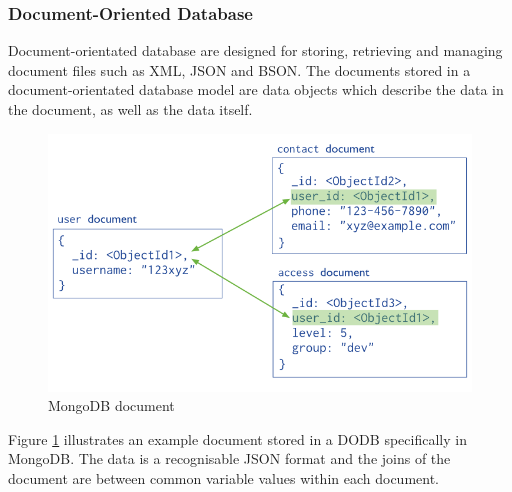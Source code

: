\subsubsection{Document-Oriented Database}
Document-orientated database are designed for storing, retrieving and managing document files such as XML, JSON and BSON. The documents stored in a document-orientated database model are data objects which describe the data in the document, as well as the data itself. \begin{figure}[h]\begin{center}\includegraphics[width=0.75\linewidth]{images/mongodbmodel}\caption{MongoDB document}\label{fig:mongo}\end{center}\end{figure} Figure \ref{fig:mongo} illustrates an example document stored in a DODB specifically in MongoDB. The data is a recognisable JSON format and the joins of the document are between common variable values within each document.

